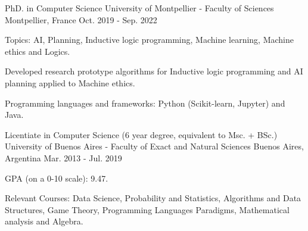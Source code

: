 

\begin{cventries}

  \cventry
    {PhD. in Computer Science}
    {University of Montpellier - Faculty of Sciences}
    {Montpellier, France}
    {Oct. 2019 - Sep. 2022}
    {
      \begin{cvitems}
        \item Topics: AI, Planning, Inductive logic programming, Machine learning, Machine ethics and Logics.
        \item Developed research prototype algorithms for Inductive logic programming and AI planning applied to Machine ethics.
        \item Programming languages and frameworks: Python (Scikit-learn, Jupyter) and Java.
      \end{cvitems}
    }  

  \cventry
  {Licentiate in Computer Science (6 year degree, equivalent to Msc. + BSc.)}
  {University of Buenos Aires - Faculty of Exact and Natural Sciences}
  {Buenos Aires, Argentina}
  {Mar. 2013 - Jul. 2019}
  {
    \begin{cvitems}
      \item GPA (on a 0-10 scale): 9.47.
      \item Relevant Courses: Data Science, Probability and Statistics, Algorithms and Data Structures, Game Theory, Programming Languages Paradigms, Mathematical analysis and Algebra.
    \end{cvitems}
  }  

\end{cventries}
